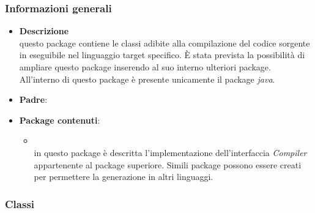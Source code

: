 \subsubsection{Informazioni generali}
\begin{itemize}
\item \textbf{Descrizione}\\
questo package contiene le classi adibite alla compilazione del codice sorgente in eseguibile nel linguaggio target specifico. È stata prevista la possibilità di ampliare questo package inserendo al suo interno ulteriori package. All'interno di questo package è presente unicamente il package \emph{java}.
\item \textbf{Padre}: \hyperref[\nogloxy{SWEDesigner::Server}]{}
\item \textbf{Package contenuti}:
\begin{itemize}
\item \hyperref[\nogloxy{SWEDesigner::Server::Compiler::Java}]{}\\
in questo package è descritta l'implementazione dell'interfaccia \emph{Compiler} appartenente al package superiore. Simili package possono essere creati per permettere la generazione in altri linguaggi.
\end{itemize}
\end{itemize}
\subsubsection{Classi}
